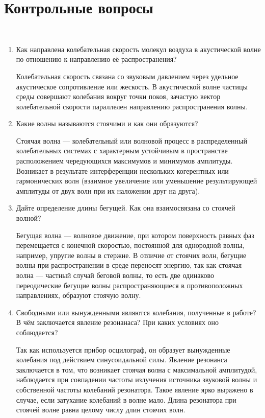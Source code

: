 \documentclass[12pt,a4paper]{article}%
\begin{document}
\section*{Контрольные вопросы}
\
\\
\begin{enumerate}
	\item Как направлена колебательная скорость молекул воздуха в акустической волне по отношению к направлению её распространения?
	
	Колебательная скорость связана со звуковым давлением через удельное акустическое сопротивление или жескость. В акустической волне частицы среды совершают колебания вокруг точки покоя, зачастую вектор колебательной скорости параллелен направлению распространения волны.
	
	\item Какие волны называются стоячими и как они образуются?
	
	Стоячая волна --- колебательный или волновой процесс в распределенный колебательных системах с характерным устойчивым в пространстве расположением чередующихся максимумов и минимумов амплитуды. Возникает в результате интерференции нескольких когерентных или гармонических волн (взаимное увеличение или уменьшение результирующей амплитуды от двух волн при их наложении друг на друга).
	
	\item Дайте определение длины бегущей. Как она взаимосвязана со стоячей волной?
	
	Бегущая волна --- волновое движение, при котором поверхность равных фаз перемещается с конечной скоростью, постоянной для однородной волны, например, упругие волны в стержне. В отличие от стоячих волн, бегущие волны при распространении в среде переносят энергию, так как стоячая волна --- частный случай беговой волны, то есть две одинаково переодические бегущие волны распространяющиеся в противоположных направлениях, образуют стоячую волну.
	
	\item  Свободными или вынужденными являются колебания, полученные в работе? В чём заключается явление резонанаса? При каких условиях оно соблюдается?
	
	Так как используется прибор осцилограф, он образует вынужденные колебания под действием синусоидальной силы. Явление резонанса заключается в том, что возникает стоячая волна с максимальной амплитудой, наблюдается при совпадении частоты излучения источника звуковой волны и собственной частоты колебаний резонатора. Такое явление ярко выражено в случае, если затухание колебаний в волне мало. Длина резонатора при стоячей волне равна целому числу длин стоячих волн.
	

\end{enumerate}
\end{document}
